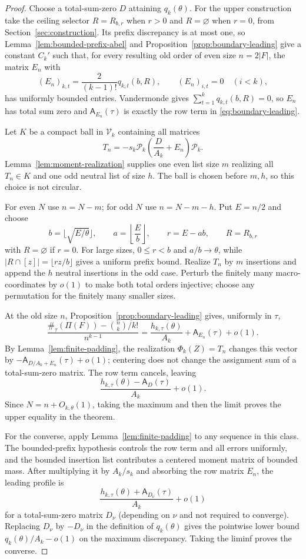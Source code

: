 \begin{proof}
Choose a total-sum-zero $D$ attaining $q_k(\theta)$.  For the upper
construction take the ceiling selector $R=R_{b,r}$ when $r>0$ and
$R=\varnothing$ when $r=0$, from Section~\ref{sec:construction}.  Its prefix
discrepancy is at most one, so
Lemma~\ref{lem:bounded-prefix-abel} and
Proposition~\ref{prop:boundary-leading} give a constant $C_k'$ such that,
for every resulting old order of even size $n=2|F|$, the matrix $E_n$ with
\[
 (E_n)_{k,t}=\frac{2}{(k-1)!}q_{k,t}(b,R),\qquad
 (E_n)_{i,t}=0\quad(i<k),
\]
has uniformly bounded entries.  Vandermonde gives
$\sum_{t=1}^kq_{k,t}(b,R)=0$, so $E_n$ has total sum zero and
$\mathsf A_{E_n}(\tau)$ is exactly the row term in
\eqref{eq:boundary-leading}.

Let $K$ be a compact ball in $\mathcal V_k$ containing all matrices
\[
 T_n=-s_k\mathcal P_k\left(\frac D{A_k}+E_n\right)\mathcal P_k.
\]
Lemma~\ref{lem:moment-realization} supplies one even list size $m$ realizing
all $T_n\in K$ and one odd neutral list of size $h$.  The ball is chosen
before $m,h$, so this choice is not circular.

For even $N$ use $n=N-m$; for odd $N$ use $n=N-m-h$.  Put $E=n/2$ and choose
\[
 b=\lfloor\sqrt{E/\theta}\rfloor,\qquad
 a=\left\lfloor\frac E b\right\rfloor,\qquad
 r=E-ab,
 \qquad R=R_{b,r}
\]
with $R=\varnothing$ if $r=0$.  For large sizes, $0\le r<b$ and
$a/b\to\theta$, while $|R\cap[z]|=\lfloor rz/b\rfloor$ gives a uniform
prefix bound.  Realize $T_n$ by $m$ insertions and append the $h$ neutral
insertions in the odd case.  Perturb the finitely many macro-coordinates by
$o(1)$ to make both total orders injective; choose any permutation for the
finitely many smaller sizes.

At the old size $n$, Proposition~\ref{prop:boundary-leading} gives, uniformly in $\tau$,
\[
 \frac{\#_\tau(\Pi(F))-\binom nk/k!}{n^{k-1}}
 =\frac{h_{k,\tau}(\theta)}{A_k}+\mathsf A_{E_n}(\tau)+o(1).
\]
By Lemma~\ref{lem:finite-padding}, the realization $\Phi_k(Z)=T_n$ changes
this vector by
$-\mathsf A_{D/A_k+E_n}(\tau)+o(1)$; centering does not change the assignment
sum of a total-sum-zero matrix.  The row term cancels, leaving
\[
 \frac{h_{k,\tau}(\theta)-\mathsf A_D(\tau)}{A_k}+o(1).
\]
Since $N=n+O_{k,\theta}(1)$, taking the maximum and then the limit proves
the upper equality in the theorem.

For the converse, apply Lemma~\ref{lem:finite-padding} to any sequence in
this class.  The bounded-prefix hypothesis controls the row term and all
errors uniformly, and the bounded insertion list contributes a centered
moment matrix of bounded mass.  After multiplying it by $A_k/s_k$ and
absorbing the row matrix $E_n$, the leading profile is
\[
 \frac{h_{k,\tau}(\theta)+\mathsf A_{D_\nu}(\tau)}{A_k}+o(1)
\]
for a total-sum-zero matrix $D_\nu$ (depending on $\nu$ and not required to
converge).  Replacing $D_\nu$ by $-D_\nu$ in the definition of $q_k(\theta)$
gives the pointwise lower bound $q_k(\theta)/A_k-o(1)$ on the maximum
discrepancy.  Taking the liminf proves the converse.
\end{proof}

